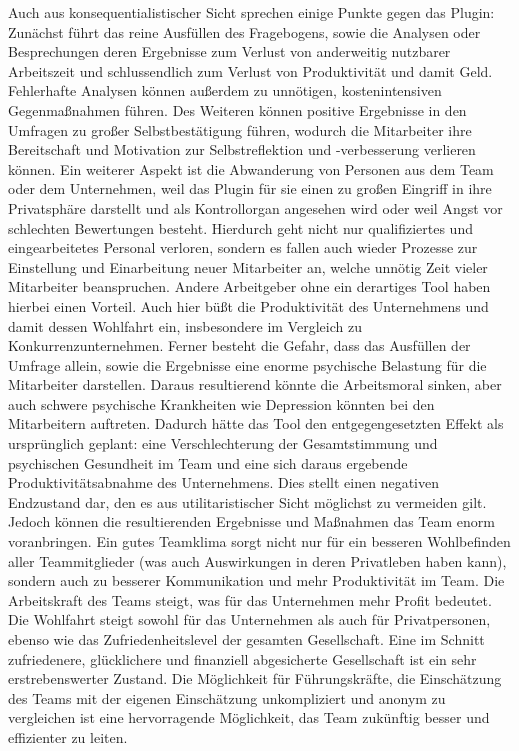 \documentclass[a4paper,12pt,]{article}
\begin{document}
Auch aus konsequentialistischer Sicht sprechen einige Punkte gegen das Plugin: Zunächst führt das reine Ausfüllen des Fragebogens, sowie die Analysen oder Besprechungen deren Ergebnisse zum Verlust von anderweitig nutzbarer Arbeitszeit und schlussendlich zum Verlust von Produktivität und damit Geld. Fehlerhafte Analysen können außerdem zu unnötigen, kostenintensiven Gegenmaßnahmen führen. Des Weiteren können positive Ergebnisse in den Umfragen zu großer Selbstbestätigung führen, wodurch die Mitarbeiter ihre Bereitschaft und Motivation zur Selbstreflektion und -verbesserung verlieren können.
Ein weiterer Aspekt ist die Abwanderung von Personen aus dem Team oder dem Unternehmen, weil das Plugin für sie einen zu großen Eingriff in ihre Privatsphäre darstellt und als Kontrollorgan angesehen wird oder weil Angst vor schlechten Bewertungen besteht. Hierdurch geht nicht nur qualifiziertes und eingearbeitetes Personal verloren, sondern es fallen auch wieder Prozesse zur Einstellung und Einarbeitung neuer Mitarbeiter an, welche unnötig Zeit vieler Mitarbeiter beanspruchen. Andere Arbeitgeber ohne ein derartiges Tool haben hierbei einen Vorteil. Auch hier büßt die Produktivität des Unternehmens und damit dessen Wohlfahrt ein, insbesondere im Vergleich zu Konkurrenzunternehmen.
Ferner besteht die Gefahr, dass das Ausfüllen der Umfrage allein, sowie die Ergebnisse eine enorme psychische Belastung für die Mitarbeiter darstellen. Daraus resultierend könnte die Arbeitsmoral sinken, aber auch schwere psychische Krankheiten wie Depression könnten bei den Mitarbeitern auftreten. Dadurch hätte das Tool den entgegengesetzten Effekt als ursprünglich geplant: eine Verschlechterung der Gesamtstimmung und psychischen Gesundheit im Team und eine sich daraus ergebende Produktivitätsabnahme des Unternehmens. Dies stellt einen negativen Endzustand dar, den es aus utilitaristischer Sicht möglichst zu vermeiden gilt. 
Jedoch können die resultierenden Ergebnisse und Maßnahmen das Team enorm voranbringen. Ein gutes Teamklima sorgt nicht nur für ein besseren Wohlbefinden aller Teammitglieder (was auch Auswirkungen in deren Privatleben haben kann), sondern auch zu besserer Kommunikation und mehr Produktivität im Team. Die Arbeitskraft des Teams steigt, was für das Unternehmen mehr Profit bedeutet. Die Wohlfahrt steigt sowohl für das Unternehmen als auch für Privatpersonen, ebenso wie das Zufriedenheitslevel der gesamten Gesellschaft. Eine im Schnitt zufriedenere, glücklichere und finanziell abgesicherte Gesellschaft ist ein sehr erstrebenswerter Zustand. 
Die Möglichkeit für Führungskräfte, die Einschätzung des Teams mit der eigenen Einschätzung unkompliziert und anonym zu vergleichen ist eine hervorragende Möglichkeit, das Team zukünftig besser und effizienter zu leiten.
\end{document}
